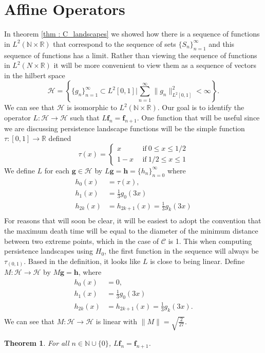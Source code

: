 \documentclass [52pt] {article}
\newcommand{\R}{\mathbb{R}}
\newcommand{\N}{\mathbb{N}}
\newcommand{\Hil}{\mathcal{H}}
\newtheorem{theorem}{Theorem}
\begin{document}
\section{Affine Operators}

In theorem \ref{thm : C_landscapes} we showed how there is a sequence of functions in $L^2(\N\times\R)$ that correspond to the sequence of sets $\{S_n\}_{n=1}^\infty$ and this sequence of functions has a limit.  Rather than viewing the sequence of functions in $L^2(N\times\R)$ it will be more convenient to view them as a sequence of vectors in the hilbert space
\[ \Hil = \left\{\{g_n\}_{n=1}^\infty \subset L^2[0,1]\bigg| \sum_{n=1}^\infty \|g_n\|_{L^2[0,1]}^2 <\infty\right\}.\]
We can see that $\Hil$ is isomorphic to $L^2(\N\times\R)$.  Our goal is to identify the operator $L:\Hil \to \Hil$ such that $L\mathbf{f}_n = \mathbf{f}_{n+1}$.  One function that will be useful since we are discussing persistence landscape functions will be the simple function $\tau:[0,1] \to\R$ defined
\[\tau(x) = \begin{cases}
x &\:\:\text{if}\:0\le x\le 1/2\\
1-x &\:\:\text{if}\:1/2\le x\le 1
\end{cases}\]
We define $L$ for each $\mathbf{g}\in \Hil$ by 
$L\mathbf{g} = \mathbf{h} = \{h_n\}_{n=0}^\infty$ where
\[\begin{split}
h_0(x) &= \tau(x),\\
h_1(x) &= \frac{1}{3}g_0(3x)\\
h_{2k}(x)&=h_{2k +1}(x) = \frac{1}{3}g_k(3x)\\
\end{split}\]
For reasons that will soon be clear, it will be easiest to adopt the convention that the maximum death time will be equal to the diameter of the minimum distance between two extreme points, which in the case of $\mathcal{C}$ is 1.  This when computing persistence landscapes using $H_0$, the first function in the sequence will always be $\tau_{(0,1)}$.  Based in the definition, it looks like $L$ is close to being linear.  Define $M:\Hil\to\Hil$ by $M\mathbf{g} = \mathbf{h}$, where
\[\begin{split}
h_0(x) &= 0,\\
h_1(x) &= \frac{1}{3}g_0(3x)\\
h_{2k}(x)&=h_{2k +1}(x) = \frac{1}{3}g_k(3x).\\
\end{split}\]
We can see that $M:\Hil\to\Hil$ is linear with $\|M\| = \sqrt{\frac{2}{27}}$.  
\begin{theorem}\label{thm : cantorset_op} For all $n\in\N\cup\{0\}$, $L\mathbf{f}_n = \mathbf{f}_{n+1}$.
\end{theorem}
\end{document}
